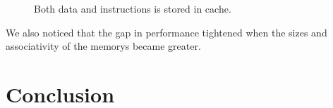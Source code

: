 \documentclass[titlepage, a4paper]{article}
\begin{document}
\begin{figure}[H]
	\centering
	\caption{Both data and instructions is stored in cache.}
	\label{fig:unified-cache}
\end{figure}

We also noticed that the gap in performance tightened when the sizes and associativity of the memorys became greater.

\section{Conclusion}
\end{document}
